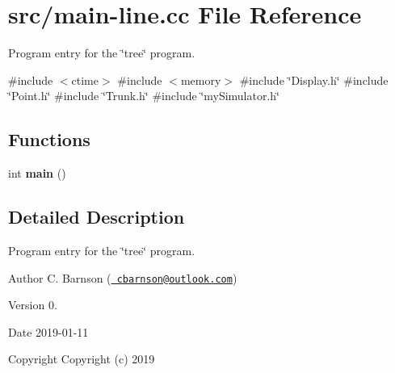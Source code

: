 \hypertarget{main-line_8cc}{}\section{src/main-\/line.cc File Reference}
\label{main-line_8cc}


Program entry for the \char`\"{}tree\char`\"{} program.  


{\ttfamily \#include $<$ctime$>$}\newline
{\ttfamily \#include $<$memory$>$}\newline
{\ttfamily \#include \char`\"{}Display.\+h\char`\"{}}\newline
{\ttfamily \#include \char`\"{}Point.\+h\char`\"{}}\newline
{\ttfamily \#include \char`\"{}Trunk.\+h\char`\"{}}\newline
{\ttfamily \#include \char`\"{}my\+Simulator.\+h\char`\"{}}\newline
\subsection*{Functions}
\begin{DoxyCompactItemize}
\item 
\mbox{\label{main-line_8cc_ae66f6b31b5ad750f1fe042a706a4e3d4}} 
int {\bfseries main} ()
\end{DoxyCompactItemize}


\subsection{Detailed Description}
Program entry for the \char`\"{}tree\char`\"{} program. 

\begin{DoxyAuthor}{Author}
C. Barnson (\href{mailto:cbarnson@outlook.com}{\texttt{ cbarnson@outlook.\+com}}) 
\end{DoxyAuthor}
\begin{DoxyVersion}{Version}
0. 
\end{DoxyVersion}
\begin{DoxyDate}{Date}
2019-\/01-\/11
\end{DoxyDate}
\begin{DoxyCopyright}{Copyright}
Copyright (c) 2019 
\end{DoxyCopyright}
